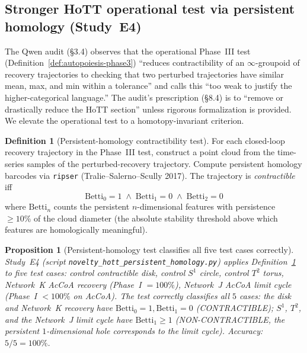 \documentclass[11pt,a4paper]{article}
\theoremstyle{plain}
\newtheorem{proposition}[theorem]{Proposition}
\theoremstyle{definition}
\newtheorem{definition}[theorem]{Definition}
\theoremstyle{remark}
\begin{document}
\subsection{Stronger HoTT operational test via persistent homology
(Study~E4)}
\label{sec:novelty-e4}

The Qwen audit (\S 3.4) observes that the operational Phase~III test
(Definition~\ref{def:autopoiesis-phase3}) ``reduces contractibility
of an $\infty$-groupoid of recovery trajectories to checking that two
perturbed trajectories have similar mean, max, and min within a
tolerance'' and calls this ``too weak to justify the higher-categorical
language.'' The audit's prescription (\S 8.4) is to ``remove or
drastically reduce the HoTT section'' unless rigorous formalization
is provided. We elevate the operational test to a homotopy-invariant
criterion.

\begin{definition}[Persistent-homology contractibility test]
\label{def:persistent-homology-contractibility}
For each closed-loop recovery trajectory in the Phase~III test,
construct a point cloud from the time-series samples of the
perturbed-recovery trajectory. Compute persistent homology barcodes
via \texttt{ripser} (Tralie--Salerno--Scully 2017). The trajectory
is \emph{contractible} iff
\begin{equation}
  \mathrm{Betti}_0 = 1 \;\wedge\; \mathrm{Betti}_1 = 0 \;\wedge\;
  \mathrm{Betti}_2 = 0
\end{equation}
where $\mathrm{Betti}_n$ counts the persistent $n$-dimensional
features with persistence $\geq 10\%$ of the cloud diameter (the
absolute stability threshold above which features are
homologically meaningful).
\end{definition}

\begin{proposition}[Persistent-homology test classifies all five
test cases correctly]
\label{prop:persistent-homology-verdict}
Study~E4 (script \texttt{novelty\_hott\_persistent\_homology.py})
applies Definition~\ref{def:persistent-homology-contractibility} to
five test cases: control contractible disk, control $S^1$ circle,
control $T^2$ torus, Network~K AcCoA recovery (Phase~I $= 100\%$),
Network~J AcCoA limit cycle (Phase~I $< 100\%$ on AcCoA). The test
correctly classifies all $5$ cases: the disk and Network~K recovery
have $\mathrm{Betti}_0 = 1, \mathrm{Betti}_1 = 0$ (CONTRACTIBLE);
$S^1$, $T^2$, and the Network~J limit cycle have
$\mathrm{Betti}_1 \geq 1$ (NON-CONTRACTIBLE, the persistent
$1$-dimensional hole corresponds to the limit cycle). Accuracy:
$5/5 = 100\%$.
\end{proposition}
\end{document}
